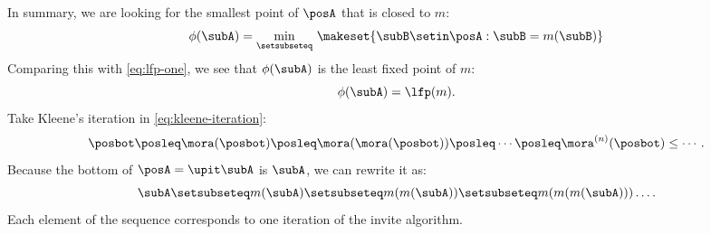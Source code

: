 In summary, we are looking for the smallest point of $\posA$ that is closed to $m$:
%
\begin{equation}
    \phi(\subA) = \min_{\setsubseteq}\, \makeset{ \subB \setin \posA : \subB = m(\subB) }
\end{equation}
Comparing this with \cref{eq:lfp-one}, we see that $ \phi(\subA)$ is the least fixed point of $m$:
\begin{equation}
    \phi(\subA) = \lfp(m).
\end{equation}
%
Take Kleene's iteration in \cref{eq:kleene-iteration}:
\begin{equation}
    \posbot\posleq \mora(\posbot)\posleq \mora(\mora(\posbot))\posleq\cdots\posleq \mora^{(n)}(\posbot)\leq\cdots.
\end{equation}
Because the bottom of $\posA = \upit \subA$ is $\subA$, we can rewrite it as:
\begin{equation}
    \subA \setsubseteq  m(\subA ) \setsubseteq m(m(\subA)) \setsubseteq m(m(m(\subA))) \dots .
\end{equation}
Each element of the sequence corresponds to one iteration of the invite algorithm.
